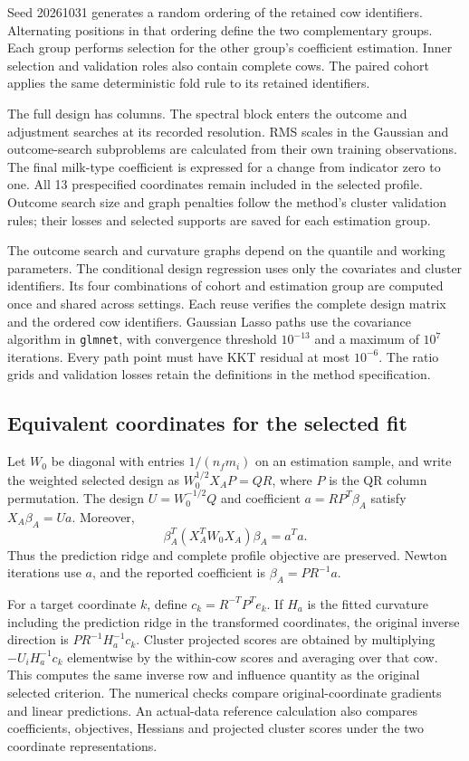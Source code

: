Seed 20261031 generates a random ordering of the retained cow
identifiers. Alternating positions in that ordering define the
two complementary groups. Each group performs selection for the
other group's coefficient estimation. Inner selection and validation
roles also contain complete cows. The paired cohort applies the
same deterministic fold rule to its retained identifiers.

The full design has \MilkDimension{} columns. The spectral block
enters the outcome and adjustment searches at its recorded resolution.
RMS scales in the Gaussian and outcome-search subproblems are
calculated from their own training observations. The final milk-type
coefficient is expressed for a change from indicator zero to one.
All 13 prespecified coordinates remain included in the selected
profile. Outcome search size and graph penalties follow the method's
cluster validation rules; their losses and selected supports are
saved for each estimation group.

The outcome search and curvature graphs depend on the quantile and
working parameters. The conditional design regression uses only the
covariates and cluster identifiers. Its four combinations of cohort
and estimation group are computed once and shared across settings.
Each reuse verifies the complete design matrix and the ordered cow
identifiers. Gaussian Lasso paths use the covariance algorithm in
\texttt{glmnet}, with convergence threshold $10^{-13}$ and a maximum
of $10^7$ iterations. Every path point must have KKT residual at most
$10^{-6}$. The ratio grids and validation losses retain the
definitions in the method specification.

\subsection{Equivalent coordinates for the selected fit}

Let $W_0$ be diagonal with entries $1/(n_fm_i)$ on an estimation
sample, and write the weighted selected design as
$W_0^{1/2}X_AP=QR$, where $P$ is the QR column permutation.
The design $U=W_0^{-1/2}Q$ and coefficient
$a=RP^T\beta_A$ satisfy $X_A\beta_A=Ua$. Moreover,
\[
 \beta_A^T(X_A^TW_0X_A)\beta_A=a^Ta.
\]
Thus the prediction ridge and complete profile objective are
preserved. Newton iterations use $a$, and the reported coefficient
is $\beta_A=PR^{-1}a$.

For a target coordinate $k$, define
$c_k=R^{-T}P^Te_k$. If $H_a$ is the fitted curvature including the
prediction ridge in the transformed coordinates, the original
inverse direction is $PR^{-1}H_a^{-1}c_k$. Cluster projected scores
are obtained by multiplying $-U_iH_a^{-1}c_k$ elementwise by the
within-cow scores and averaging over that cow. This computes the
same inverse row and influence quantity as the original selected
criterion. The numerical checks compare original-coordinate gradients
and linear predictions. An actual-data reference calculation also
compares coefficients, objectives, Hessians and projected cluster
scores under the two coordinate representations.

